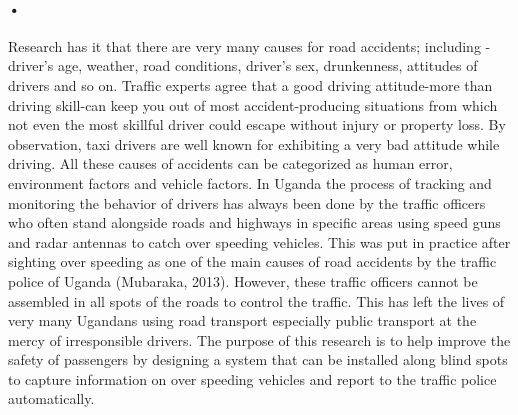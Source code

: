 \documentclass[12pt]{report}
\begin{document}
\paragraph{•}
Research has it that there are very many causes for road accidents; including - driver's age, weather, road conditions, driver's sex, drunkenness, attitudes of drivers and so on.\cite{hellen} Traffic experts agree that a good driving attitude-more than driving skill-can keep you out of most accident-producing situations from which not even the most skillful driver could escape without injury or property loss.\cite{stone} By observation, taxi drivers are well known for exhibiting a very bad attitude while driving. All these causes of accidents can be categorized as human error, environment factors and vehicle factors. In Uganda the process of tracking and  monitoring the behavior of drivers  has always been done  by the  traffic  officers  who often stand alongside roads and highways in specific areas using speed guns and radar antennas to catch over 
speeding  vehicles.  This  was  put  in  practice  after  sighting  over  speeding  as  one  of  the  main  causes  of  road accidents  by  the  traffic  police  of  Uganda  (Mubaraka,  2013).  However,  these  traffic  officers  cannot  be assembled in all spots of the roads to control the traffic. This has left the lives of very many Ugandans using road transport especially public transport at the mercy of irresponsible drivers.\cite{mukreport} The purpose of this research is to help improve the safety of passengers by designing a system that can be installed along blind spots to capture information on over speeding vehicles and report to the traffic police automatically.
\end{document}
